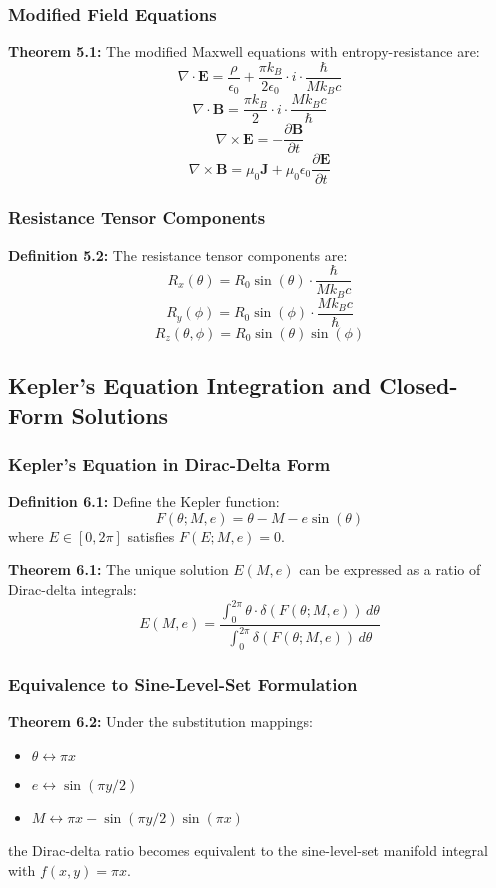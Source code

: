 ﻿\documentclass[12pt]{article}
\begin{document}
\subsubsection{Modified Field Equations}
\textbf{Theorem 5.1:} The modified Maxwell equations with entropy-resistance are:
$$\nabla \cdot \mathbf{E} = \frac{\rho}{\epsilon_0} + \frac{\pi k_B}{2\epsilon_0} \cdot i \cdot \frac{\hbar}{Mk_Bc}$$
$$\nabla \cdot \mathbf{B} = \frac{\pi k_B}{2} \cdot i \cdot \frac{Mk_Bc}{\hbar}$$
$$\nabla \times \mathbf{E} = -\frac{\partial \mathbf{B}}{\partial t}$$
$$\nabla \times \mathbf{B} = \mu_0 \mathbf{J} + \mu_0\epsilon_0\frac{\partial \mathbf{E}}{\partial t}$$

\subsubsection{Resistance Tensor Components}
\textbf{Definition 5.2:} The resistance tensor components are:
$$R_x(\theta) = R_0 \sin(\theta) \cdot \frac{\hbar}{Mk_Bc}$$
$$R_y(\phi) = R_0 \sin(\phi) \cdot \frac{Mk_Bc}{\hbar}$$
$$R_z(\theta,\phi) = R_0 \sin(\theta)\sin(\phi)$$

\subsection{Kepler's Equation Integration and Closed-Form Solutions}

\subsubsection{Kepler's Equation in Dirac-Delta Form}
\textbf{Definition 6.1:} Define the Kepler function:
$$F(\theta; M, e) = \theta - M - e\sin(\theta)$$
where $E \in [0, 2\pi]$ satisfies $F(E; M, e) = 0$.

\textbf{Theorem 6.1:} The unique solution $E(M, e)$ can be expressed as a ratio of Dirac-delta integrals:
$$E(M, e) = \frac{\int_0^{2\pi} \theta \cdot \delta(F(\theta; M, e)) \, d\theta}{\int_0^{2\pi} \delta(F(\theta; M, e)) \, d\theta}$$

\subsubsection{Equivalence to Sine-Level-Set Formulation}
\textbf{Theorem 6.2:} Under the substitution mappings:
\begin{itemize}
   \item $\theta \leftrightarrow \pi x$
   \item $e \leftrightarrow \sin(\pi y/2)$
   \item $M \leftrightarrow \pi x - \sin(\pi y/2)\sin(\pi x)$
\end{itemize}
the Dirac-delta ratio becomes equivalent to the sine-level-set manifold integral with $f(x,y) = \pi x$.
\end{document}

